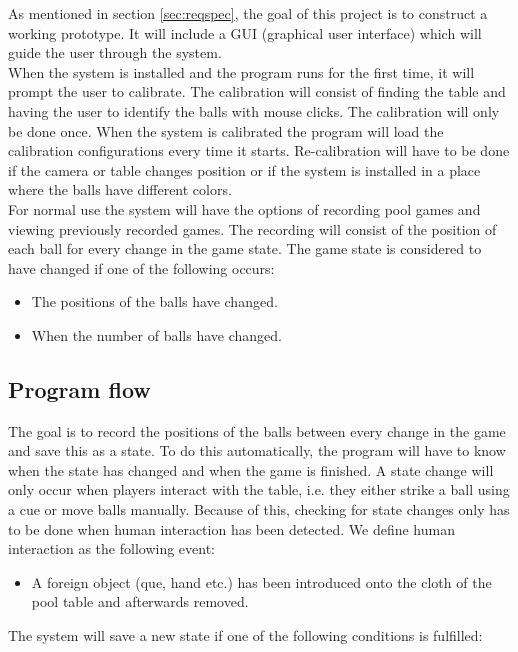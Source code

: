 As mentioned in section \ref{sec:reqspec}, the goal of this project is to construct a working prototype. It will include a GUI (graphical user interface) which will guide the user through the system.\\

When the system is installed and the program runs for the first time, it will prompt the user to calibrate. The calibration will consist of finding the table and having the user to identify the balls with mouse clicks. The calibration will only be done once. When the system is calibrated the program will load the calibration configurations every time it starts. Re-calibration will have to be done if the camera or table changes position or if the system is installed in a place where the balls have different colors.\\

For normal use the system will have the options of recording pool games and viewing previously recorded games. The recording will consist of the position of each ball for every change in the game state. The game state is considered to have changed if one of the following occurs:\\ 
\begin{itemize}
	\item The positions of the balls have changed.
	\item When the number of balls have changed.
\end{itemize}

\subsection{Program flow}
The goal is to record the positions of the balls between every change in the game and save this as a state. To do this automatically, the program will have to know when the state has changed and when the game is finished. A state change will only occur when players interact with the table, i.e. they either strike a ball using a cue or move balls manually. Because of this, checking for state changes only has to be done when human interaction has been detected. We define human interaction as the following event:
\begin{itemize}
	\item  A foreign object (que, hand etc.) has been introduced onto the cloth of the pool table and afterwards removed.
\end{itemize}

The system will save a new state if one of the following conditions is fulfilled:

